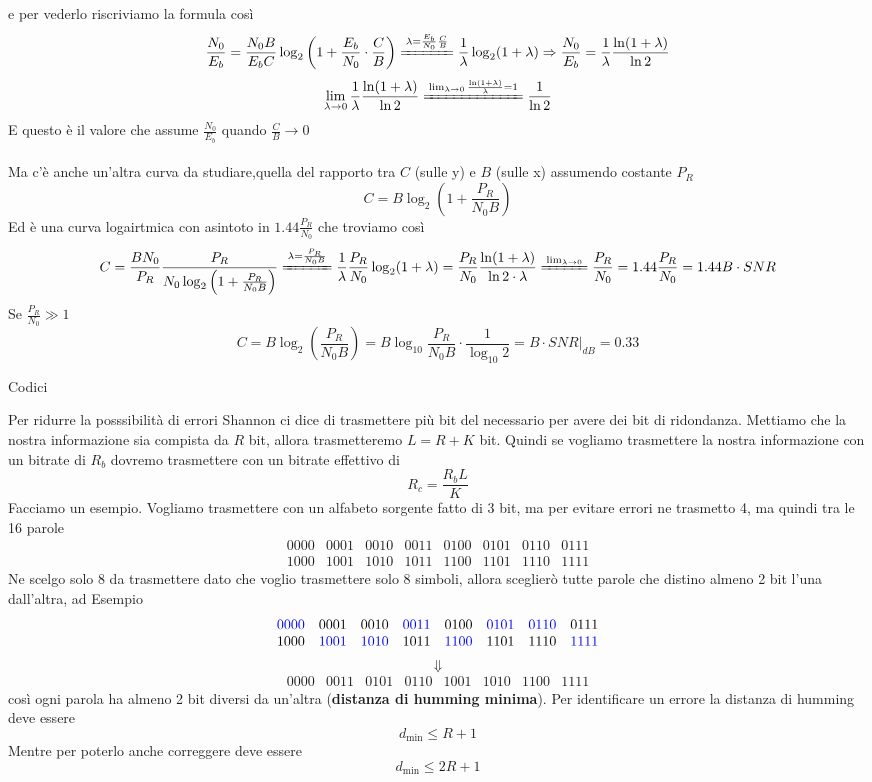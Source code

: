 \documentclass{article}
\newcommand{\accapo}{\\\hspace*{1cm}\\}
\begin{document}
e per vederlo riscriviamo la formula così
\[\frac{N_0}{E_b}=\frac{N_0 B}{E_b C}\log_2\left(1+\frac{E_b}{N_0}\cdot\frac{C}{B}\right)\xlongequal{\lambda=\frac{E_b}{N_0}\frac{C}{B}}\frac{1}{\lambda}\log_2(1+\lambda)\Rightarrow\frac{N_0}{E_b}=\frac{1}{\lambda}\frac{\ln(1+\lambda)}{\ln 2}\]
\[\lim_{\lambda\to0}\frac{1}{\lambda}\frac{\ln(1+\lambda)}{\ln 2}\xlongequal{\lim_{\lambda\to0}\frac{\ln(1+\lambda)}{\lambda}=1}\frac{1}{\ln 2}\]
E questo è il valore che assume \(\frac{N_0}{E_b}\) quando \(\frac{C}{B}\to0\)\accapo
Ma c'è anche un'altra curva da studiare,quella del rapporto tra \(C\) (sulle y) e \(B\) (sulle x) assumendo costante \(P_R\)
\[C=B\log_2\left(1+\frac{P_R}{N_0 B}\right)\]
Ed è una curva logairtmica con asintoto in \(1.44\frac{P_R}{N_0}\) che troviamo così 
\[C=\frac{B N_0}{P_R}\frac{P_R}{N_0\log_2\left(1+\frac{P_R}{N_0 B}\right)}\xlongequal{\lambda=\frac{P_R}{N_0 B}}\frac{1}{\lambda}\frac{P_R}{N_0}\log_2(1+\lambda)=\frac{P_R}{N_0}\frac{\ln(1+\lambda)}{\ln 2\cdot\lambda}\xlongequal{\lim_{\lambda\to0}}\frac{P_R}{N_0}=1.44\frac{P_R}{N_0}=1.44 B\cdot SNR\]
Se \(\frac{P_R}{N_0}\gg1\)
\[C=B\log_2\left(\frac{P_R}{N_0B}\right)=B\log_{10}\frac{P_R}{N_0 B}\cdot\frac{1}{\log_{10}2}=B\cdot SNR|_{dB}=0.33\]
\begin{center}
\Huge Codici
\end{center}\normalsize
Per ridurre la posssibilità di errori Shannon ci dice di trasmettere più bit del necessario per avere dei bit di ridondanza. Mettiamo che la nostra informazione sia compista da \(R\) bit, allora trasmetteremo \(L=R+K\) bit. Quindi se vogliamo trasmettere la nostra informazione con un bitrate di \(R_b\) dovremo trasmettere con un bitrate effettivo di 
\[R_c=\frac{R_b L}{K}\]
Facciamo un esempio. Vogliamo trasmettere con un alfabeto sorgente fatto di 3 bit, ma per evitare errori ne trasmetto 4, ma quindi tra le 16 parole
\[\begin{matrix}
    0000&
    0001&
    0010&
    0011&
    0100&
    0101&
    0110&
    0111\\
    1000&
    1001&
    1010&
    1011&
    1100&
    1101&
    1110&
    1111
\end{matrix}\]
Ne scelgo solo 8 da trasmettere dato che voglio trasmettere solo 8 simboli, allora sceglierò tutte parole che distino almeno 2 bit l'una dall'altra, ad Esempio
\[\begin{matrix}
    \textcolor{blue}{0000}&
    0001&
    0010&
    \textcolor{blue}{0011}&
    0100&
    \textcolor{blue}{0101}&
    \textcolor{blue}{0110}&
    0111\\
    1000&
    \textcolor{blue}{1001}&
    \textcolor{blue}{1010}&
    1011&
    \textcolor{blue}{1100}&
    1101&
    1110&
    \textcolor{blue}{1111}
\end{matrix}\]
\[\Downarrow\]
\[\begin{matrix}
    0000&
    0011&
    0101&
    0110&
    1001&
    1010&
    1100&
    1111
\end{matrix}\]
così ogni parola ha almeno 2 bit diversi da un'altra (\textbf{distanza di humming minima}). Per identificare un errore la distanza di humming deve essere
\[d_{\min}\leq R+1\]
Mentre per poterlo anche correggere deve essere
\[d_{\min}\leq 2R+1\]
\end{document}
